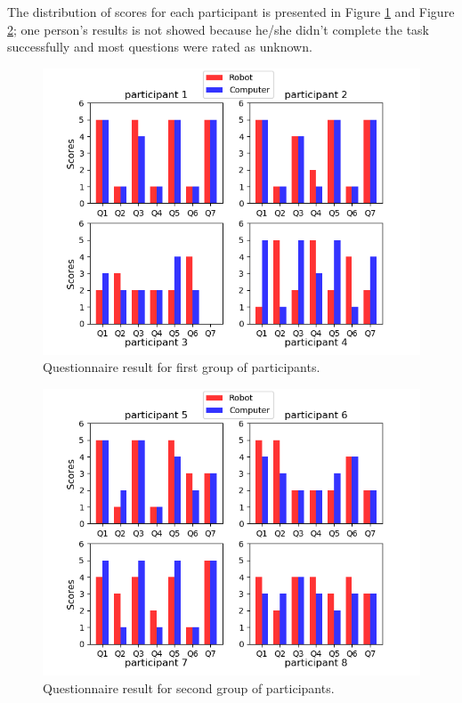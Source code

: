 \documentclass[conference]{IEEEtran}
\begin{document}
The distribution of scores for each participant is presented in Figure \ref{fig:questionnaire_distrib_1} and Figure \ref{fig:questionnaire_distrib_2}; one person's results is not showed because he/she didn't complete the task successfully and most questions were rated as unknown.

\begin{figure}[h]
	\flushleft 
	\includegraphics[width=1.05\linewidth]{figures/first.png}
	\caption{\label{fig:questionnaire_distrib_1}Questionnaire result for first group of participants.}
\end{figure}

\begin{figure}[h]
	\flushleft 
	\includegraphics[width=1.05\linewidth]{figures/last.png}
	\caption{\label{fig:questionnaire_distrib_2}Questionnaire result for second group of participants.}
\end{figure}
\end{document}
